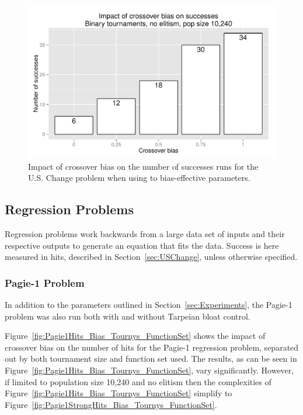 \documentclass{sig-alternate}
\begin{document}
\begin{figure}
\centering
\includegraphics[width=0.45 \textwidth]{Plots/US_change_successes_strong.pdf}
\caption{Impact of crossover bias on the number of successes runs for the U.S. Change problem when using to
bias-effective parameters.}
\label{fig:USChange_Successes_strong}
\end{figure}

%
%
%
%


\subsection{Regression Problems}

Regression problems work backwards from a large data set of inputs and their respective outputs to generate an equation
that fits the data. Success is here measured in hits, described in Section~\ref{sec:USChange}, unless otherwise
specified.

\subsubsection{Pagie-1 Problem}

In addition to the parameters outlined in Section~\ref{sec:Experiments}, the Pagie-1 problem was also run both with and
without Tarpeian bloat control.

Figure~\ref{fig:Pagie1Hits_Bias_Tournys_FunctionSet} shows the impact of crossover bias on the number of hits for the
Pagie-1 regression problem, separated out by both tournament size and function set used. The results, as can be seen in
Figure~\ref{fig:Pagie1Hits_Bias_Tournys_FunctionSet}, vary significantly. However, if limited to population size 10,240
and no elitism then the complexities of Figure~\ref{fig:Pagie1Hits_Bias_Tournys_FunctionSet} simplify to
Figure~\ref{fig:Pagie1StrongHits_Bias_Tournys_FunctionSet}.
\end{document}
